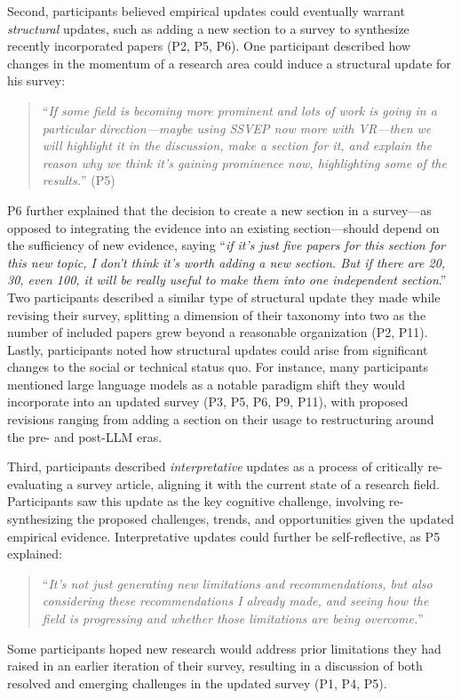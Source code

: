 Second, participants believed empirical updates could eventually warrant \textit{structural} updates, such as adding a new section to a survey to synthesize recently incorporated papers (P2, P5, P6). One participant described how changes in the momentum of a research area could induce a structural update for his survey:
\begin{quote}
    ``\textit{If some field is becoming more prominent and lots of work is going in a particular direction---maybe using SSVEP now more with VR---then we will highlight it in the discussion, make a section for it, and explain the reason why we think it's gaining prominence now, highlighting some of the results.}'' (P5)
\end{quote}
P6 further explained that the decision to create a new section in a survey---as opposed to integrating the evidence into an existing section---should depend on the sufficiency of new evidence, saying ``\textit{if it’s just five papers for this section for this new topic, I don't think it's worth adding a new section. But if there are 20, 30, even 100, it will be really useful to make them into one independent section}.'' Two participants described a similar type of structural update they made while revising their survey, splitting a dimension of their taxonomy into two as the number of included papers grew beyond a reasonable organization (P2, P11). Lastly, participants noted how structural updates could arise from significant changes to the social or technical status quo. For instance, many participants mentioned large language models as a notable paradigm shift they would incorporate into an updated survey (P3, P5, P6, P9, P11), with proposed revisions ranging from adding a section on their usage to restructuring around the pre- and post-LLM eras.

Third, participants described \textit{interpretative} updates as a process of critically re-evaluating a survey article, aligning it with the current state of a research field. Participants saw this update as the key cognitive challenge, involving re-synthesizing the proposed challenges, trends, and opportunities given the updated empirical evidence. Interpretative updates could further be self-reflective, as P5 explained:
\begin{quote}
    ``\textit{It's not just generating new limitations and recommendations, but also considering these recommendations I already made, and seeing how the field is progressing and whether those limitations are being overcome.}''
\end{quote}
Some participants hoped new research would address prior limitations they had raised in an earlier iteration of their survey, resulting in a discussion of both resolved and emerging challenges in the updated survey (P1, P4, P5).

